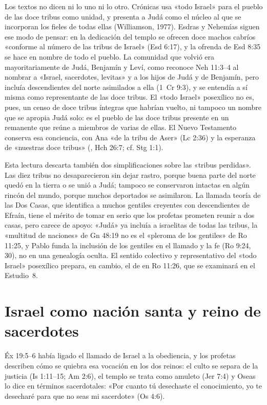 Los textos no dicen ni lo uno ni lo otro. Crónicas usa «todo Israel» para el pueblo de las doce tribus como unidad, y presenta a Judá como el núcleo al que se incorporan los fieles de todas ellas (Williamson, 1977). Esdras y Nehemías siguen ese modo de pensar: en la dedicación del templo se ofrecen doce machos cabríos «conforme al número de las tribus de Israel» (Esd 6:17), y la ofrenda de Esd 8:35 se hace en nombre de todo el pueblo. La comunidad que volvió era mayoritariamente de Judá, Benjamín y Leví, como reconoce Neh 11:3--4 al nombrar a «Israel, sacerdotes, levitas» y a los hijos de Judá y de Benjamín, pero incluía descendientes del norte asimilados a ella (1~Cr 9:3), y se entendía a sí misma como representante de las doce tribus. El «todo Israel» posexílico no es, pues, un censo de doce tribus íntegras que habrían vuelto, ni tampoco un nombre que se apropia Judá solo: es el pueblo de las doce tribus presente en un remanente que reúne a miembros de varias de ellas. El Nuevo Testamento conserva esa conciencia, con Ana «de la tribu de Aser» (Lc 2:36) y la esperanza de «nuestras doce tribus» (, Hch 26:7; cf. Stg 1:1).

Esta lectura descarta también dos simplificaciones sobre las «tribus perdidas». Las diez tribus no desaparecieron sin dejar rastro, porque buena parte del norte quedó en la tierra o se unió a Judá; tampoco se conservaron intactas en algún rincón del mundo, porque muchos deportados se asimilaron. La llamada teoría de las Dos Casas, que identifica a muchos gentiles creyentes con descendientes de Efraín, tiene el mérito de tomar en serio que los profetas prometen reunir a dos casas, pero carece de apoyo: «Judá» ya incluía a israelitas de todas las tribus, la «multitud de naciones» de Gn 48:19 no es el «pleroma de los gentiles» de Ro 11:25, y Pablo funda la inclusión de los gentiles en el llamado y la fe (Ro 9:24, 30), no en una genealogía oculta. El sentido colectivo y representativo del «todo Israel» posexílico prepara, en cambio, el de  en Ro 11:26, que se examinará en el Estudio~8.

\section{Israel como nación santa y reino de sacerdotes}

Éx 19:5--6 había ligado el llamado de Israel a la obediencia, y los profetas describen cómo se quiebra esa vocación en los dos reinos: el culto se separa de la justicia (Is 1:11--15; Am 2:6), el templo se trata como amuleto (Jer 7:4) y Oseas lo dice en términos sacerdotales: «Por cuanto tú desechaste el conocimiento, yo te desecharé para que no seas mi sacerdote» (Os 4:6).

